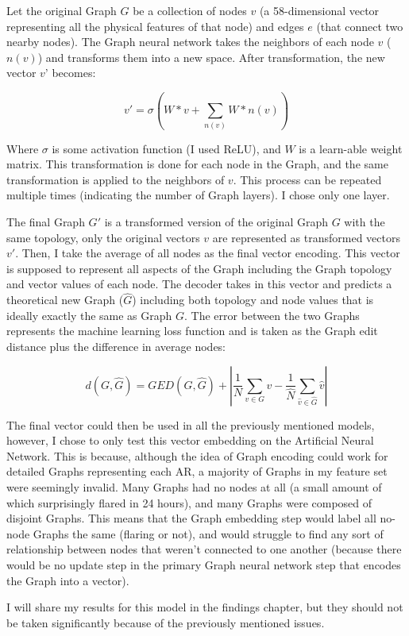 Let the original Graph $G$ be a collection of nodes $v$ (a 58-dimensional vector representing all the physical features of that node) and edges $e$ (that connect two nearby nodes).  The Graph neural network takes the neighbors of each node $v$ ($n(v)$) and  transforms them into a new space. After transformation, the new vector $v’$ becomes:

$$v'= \sigma (W*v + \sum_{n(v)} W*n(v))$$ 

Where $\sigma$ is some activation function (I used ReLU), and $W$ is a  learn-able weight matrix. This transformation is done for each node in the Graph, and the same transformation is applied to the neighbors of $v$. This process can be repeated multiple times (indicating the number of Graph layers). I chose only one layer. 

The final Graph $G'$ is a transformed version of the original Graph $G$ with the same topology, only the original vectors $v$ are represented as transformed vectors $v'$. Then, I take the average of all nodes as the final vector encoding. This vector is supposed to represent all aspects of the Graph including the Graph topology and vector values of each node. The decoder takes in this vector and predicts a theoretical new Graph ($\hat{G}$) including both topology and node values that is ideally exactly the same as Graph $G$. The error between the two Graphs represents the machine learning loss function and is taken as the Graph edit distance plus the difference in average nodes:

$$d(G, \hat{G}) = GED(G, \hat{G}) + |\frac{1}{N}\sum_{v \in G}v - \frac{1}{\hat{N}}\sum_{\hat{v} \in \hat{G}}\hat{v}|$$

The final vector could then be used in all the previously mentioned models, however, I chose to only test this vector embedding on the Artificial Neural Network. This is because, although the idea of Graph encoding could work for detailed Graphs representing each AR, a majority of Graphs in my feature set were seemingly invalid. Many Graphs had no nodes at all (a small amount of which surprisingly flared in 24 hours), and many Graphs were composed of disjoint Graphs. This means that the Graph embedding step would label all no-node Graphs the same (flaring or not), and would struggle to find any sort of relationship between nodes that weren't connected to one another (because there would be no update step in the primary Graph neural network step that encodes the Graph into a vector). 

I will share my results for this model in the findings chapter, but they should not be taken significantly because of the previously mentioned issues.


